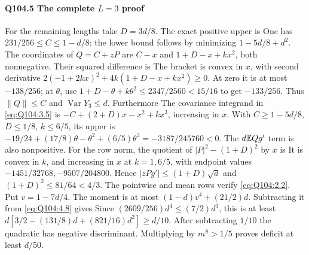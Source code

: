\paragraph{Q104.5 The complete $L=\allowbreak 3$ proof}\label{part:Q104.5}
For the remaining lengths take $D=\allowbreak 3d/8$.
The exact positive upper is
One has $231/256\le\allowbreak  C\le\allowbreak 1-d/8$; the lower bound follows by minimizing
$1-5d/8+d^2$.
The coordinates of $Q=\allowbreak C+zP$ are $C-x$ and $1+D-x+kx^2$, both nonnegative.
Their squared difference is
The bracket is convex in $x$, with second derivative
$2(-1+2kx)^2+4k(1+D-x+kx^2)\ge\allowbreak 0$.
At zero it is at most $-138/256$; at $\theta$, use
$1+D-\theta+k\theta^2\le\allowbreak 2347/2560<\allowbreak 15/16$ to get $-133/256$.
Thus $\|Q\|\le\allowbreak  C$ and $\operatorname{Var}Y_3\le\allowbreak  d$.
Furthermore
The covariance integrand in \eqref{eq:Q104:3.5} is
$-C+(2+D)x-x^2+kx^3$, increasing in $x$.
With $C\ge\allowbreak 1-5d/8$, $D\le\allowbreak 1/8$, $k\le\allowbreak 6/5$, its upper is
$-19/24+(17/8)\theta-\theta^2+(6/5)\theta^3=\allowbreak -3187/245760<\allowbreak 0$.
The $d\mathbb E Qg'$ term is also nonpositive.
For the row norm, the quotient of $|P|^2-(1+D)^2$ by $x$ is
It is convex in $k$, and increasing in $x$ at $k=\allowbreak 1,\allowbreak 6/5$, with endpoint
values $-1451/32768,\allowbreak -9507/204800$.
Hence $|zPg'|\le\allowbreak (1+D)\sqrt d$ and $(1+D)^2\le\allowbreak 81/64<\allowbreak 4/3$.
The pointwise and mean rows verify \eqref{eq:Q104:2.2}.
Put $v=\allowbreak 1-7d/4$. The moment is at most $(1-d)v^4+(21/2)d$.
Subtracting it from \eqref{eq:Q104:4.8} gives
Since $(2609/256)d^4\le\allowbreak (7/2)d^3$, this is at least
$d[3/2-(131/8)d+(821/16)d^2]\ge\allowbreak  d/10$.
After subtracting $1/10$ the quadratic has negative discriminant.
Multiplying by $m^8>\allowbreak 1/5$ proves deficit at least $d/50$.

